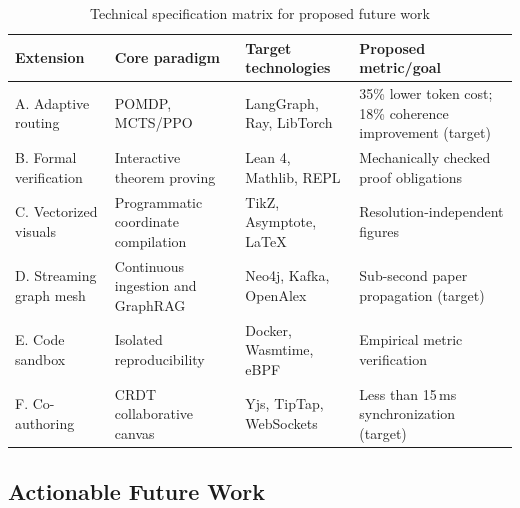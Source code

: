 \documentclass[conference]{IEEEtran}
\begin{document}
\begin{table}[t]\centering
\caption{Technical specification matrix for proposed future work}\label{tab:future-matrix}\small
\begin{tabularx}{\textwidth}{@{}lXXX@{}}
\toprule \textbf{Extension}&\textbf{Core paradigm}&\textbf{Target technologies}&\textbf{Proposed metric/goal}\\\midrule
A. Adaptive routing&POMDP, MCTS/PPO&LangGraph, Ray, LibTorch&35\% lower token cost; 18\% coherence improvement (target)\\
B. Formal verification&Interactive theorem proving&Lean 4, Mathlib, REPL&Mechanically checked proof obligations\\
C. Vectorized visuals&Programmatic coordinate compilation&TikZ, Asymptote, LaTeX&Resolution-independent figures\\
D. Streaming graph mesh&Continuous ingestion and GraphRAG&Neo4j, Kafka, OpenAlex&Sub-second paper propagation (target)\\
E. Code sandbox&Isolated reproducibility&Docker, Wasmtime, eBPF&Empirical metric verification\\
F. Co-authoring&CRDT collaborative canvas&Yjs, TipTap, WebSockets&Less than 15\,ms synchronization (target)\\
\bottomrule\end{tabularx}\end{table}
\subsection{Actionable Future Work}
\end{document}
